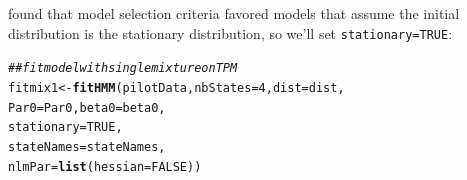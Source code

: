 \documentclass[12pt]{article}\usepackage[]{graphicx}\usepackage[]{color}
\makeatletter
\newcommand{\hlnum}[1]{\textcolor[rgb]{0.686,0.059,0.569}{#1}}%
\newcommand{\hlcom}[1]{\textcolor[rgb]{0.678,0.584,0.686}{\textit{#1}}}%
\newcommand{\hlstd}[1]{\textcolor[rgb]{0.345,0.345,0.345}{#1}}%
\newcommand{\hlkwb}[1]{\textcolor[rgb]{0.69,0.353,0.396}{#1}}%
\newcommand{\hlkwc}[1]{\textcolor[rgb]{0.333,0.667,0.333}{#1}}%
\newcommand{\hlkwd}[1]{\textcolor[rgb]{0.737,0.353,0.396}{\textbf{#1}}}%
\newenvironment{kframe}{%
 \def\at@end@of@kframe{}%
 \ifinner\ifhmode%
  \def\at@end@of@kframe{\end{minipage}}%
  \begin{minipage}{\columnwidth}%
 \fi\fi%
 \def\FrameCommand##1{\hskip\@totalleftmargin \hskip-\fboxsep
 \colorbox{shadecolor}{##1}\hskip-\fboxsep
     \hskip-\linewidth \hskip-\@totalleftmargin \hskip\columnwidth}%
 \MakeFramed {\advance\hsize-\width
   \@totalleftmargin\z@ \linewidth\hsize
   \@setminipage}}%
 {\par\unskip\endMakeFramed%
 \at@end@of@kframe}
\newenvironment{knitrout}{}{} %
\makeatother
\begin{document}
\noindent \cite{IsojunnoEtAl2017} found that model selection criteria favored models that assume the initial distribution is the stationary distribution, so we'll set \verb|stationary=TRUE|:
\begin{knitrout}
\color{fgcolor}\begin{kframe}
\begin{alltt}
\hlcom{## fit model with single mixture on TPM}
\hlstd{fitmix1} \hlkwb{<-} \hlkwd{fitHMM}\hlstd{(pilotData,} \hlkwc{nbStates}\hlstd{=}\hlnum{4}\hlstd{,} \hlkwc{dist}\hlstd{=dist,}
                  \hlkwc{Par0}\hlstd{=Par0,} \hlkwc{beta0}\hlstd{=beta0,}
                  \hlkwc{stationary}\hlstd{=}\hlnum{TRUE}\hlstd{,}
                  \hlkwc{stateNames}\hlstd{=stateNames,}
                  \hlkwc{nlmPar}\hlstd{=}\hlkwd{list}\hlstd{(}\hlkwc{hessian}\hlstd{=}\hlnum{FALSE}\hlstd{))}
\end{alltt}
\end{kframe}
\end{knitrout}
\end{document}
